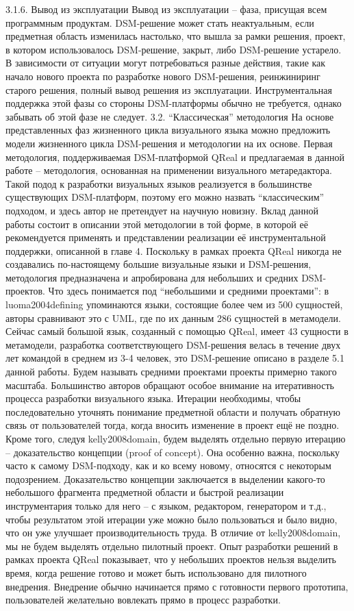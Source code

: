 3.1.6. Вывод из эксплуатации
	Вывод из эксплуатации – фаза, присущая всем программным продуктам. DSM-решение может стать неактуальным, если предметная область изменилась настолько, что вышла за рамки решения, проект, в котором использовалось DSM-решение, закрыт, либо DSM-решение устарело. В зависимости от ситуации могут потребоваться разные действия, такие как начало нового проекта по разработке нового DSM-решения, реинжиниринг старого решения, полный вывод решения из эксплуатации. Инструментальная поддержка этой фазы со стороны DSM-платформы обычно не требуется, однако забывать об этой фазе не следует.
3.2. “Классическая” методология
	На основе представленных фаз жизненного цикла визуального языка можно предложить модели жизненного цикла DSM-решения и методологии на их основе. Первая методология, поддерживаемая DSM-платформой QReal и предлагаемая в данной работе – методология, основанная на применении визуального метаредактора. Такой подод к разработки визуальных языков реализуется в большинстве существующих DSM-платформ, поэтому его можно назвать “классическим” подходом, и здесь автор не претендует на научную новизну. Вклад данной работы состоит в описании этой методологии в той форме, в которой её рекомендуется применять и представлении реализации её инструментальной поддержки, описанной в главе 4. 
	Поскольку в рамках проекта QReal никогда не создавались по-настоящему большие визуальные языки и DSM-решения, методология предназначена и апробирована для небольших и средних DSM-проектов. Что здесь понимается под “небольшими и средними проектами”: в luoma2004defining упоминаются языки, состоящие более чем из 500 сущностей, авторы сравнивают это с UML, где по их данным 286 сущностей в метамодели. Сейчас самый большой язык, созданный с помощью QReal, имеет 43 сущности в метамодели, разработка соответствующего DSM-решения велась в течение двух лет командой в среднем из 3-4 человек, это DSM-решение описано в разделе 5.1 данной работы. Будем называть средними проектами проекты примерно такого масштаба.
	Большинство авторов обращают особое внимание на итеративность процесса разработки визуального языка. Итерации необходимы, чтобы последовательно уточнять понимание предметной области и получать обратную связь от пользователей тогда, когда вносить изменение в проект ещё не поздно. Кроме того, следуя kelly2008domain, будем выделять отдельно первую итерацию – доказательство концепции (proof of concept). Она особенно важна, поскольку часто к самому DSM-подходу, как и ко всему новому, относятся с некоторым подозрением. Доказательство концепции заключается в выделении какого-то небольшого фрагмента предметной области и быстрой реализации инструментария только для него – с языком, редактором, генератором и т.д., чтобы результатом этой итерации уже можно было пользоваться и было видно, что он уже улучшает производительность труда. В отличие от kelly2008domain, мы не будем выделять отдельно пилотный проект. Опыт разработки решений в рамках проекта QReal показывает, что у небольших проектов нельзя выделить время, когда решение готово и может быть использовано для пилотного внедрения. Внедрение обычно начинается прямо с готовности первого прототипа, пользователей желательно вовлекать прямо в процесс разработки.

